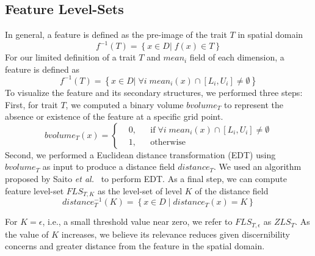 \vspace{-2mm}
\subsection{Feature Level-Sets}
In general, a feature is defined as the pre-image of the trait $T$ in spatial domain
\begin{equation}
f^{-1}(T) = \left\{ x \in D |\; f(x) \in T \right\}
\end{equation}
%
For our limited definition of a trait $T$ and $mean_{i}$ field of each dimension, a feature is defined as 
\begin{equation}
f^{-1}(T) = \left\{ x \in D |\; \forall i\;mean_{i}(x) \cap [L_{i}, U_{i}] \neq \emptyset\right\}
\end{equation}
To visualize the feature and its secondary structures, we performed three steps:
%
First, for trait $T$, we computed a binary volume $bvolume_{T}$ to represent the absence or existence of the feature at a specific grid point.
%
\begin{equation}
  bvolume_{T}(x) = \left \{
  \begin{aligned}
    &0, && \text{if}\; \forall i\; mean_{i}(x) \cap [L_{i}, U_{i}] \neq \emptyset \\
    &1, && \text{otherwise}
  \end{aligned} \right.
\end{equation}
%
Second, we performed a Euclidean distance transformation (EDT) using $bvolume_{T}$ as input to produce a distance field $distance_{T}$. 
%
We used an algorithm proposed by Saito \textit{et al.}~\cite{saito1994new} to perform EDT.
%
As a final step, we can compute feature level-set $FLS_{T,K}$ as the level-set of level $K$ of the distance field 
%
\begin{equation} 
distance_{T}^{-1}(K) = \left\{ x \in D\; |\; distance_{T}(x) = K\right\}
\end{equation}

For $K = \epsilon$, i.e., a small threshold value near zero, we refer to $FLS_{T,\epsilon}$ as $ZLS_{T}$.
%
As the value of $K$ increases, we believe  its relevance reduces given discernibility concerns and greater distance from the feature in the spatial domain.
%

